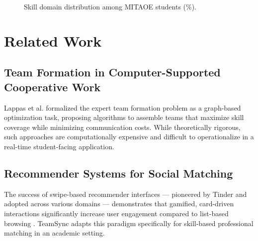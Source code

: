 \documentclass[conference]{IEEEtran}
\begin{document}
\begin{figure}[htbp]
\centering
{}
\caption{Skill domain distribution among MITAOE students (\%).}
\label{fig:domains}
\end{figure}

\section{Related Work}

\subsection{Team Formation in Computer-Supported Cooperative Work}
Lappas et al. \cite{lappas2009finding} formalized the expert team formation problem as a graph-based optimization task, proposing algorithms to assemble teams that maximize skill coverage while minimizing communication costs. While theoretically rigorous, such approaches are computationally expensive and difficult to operationalize in a real-time student-facing application.

\subsection{Recommender Systems for Social Matching}
The success of swipe-based recommender interfaces --- pioneered by Tinder and adopted across various domains --- demonstrates that gamified, card-driven interactions significantly increase user engagement compared to list-based browsing \cite{tyson2016wanted}. TeamSync adapts this paradigm specifically for skill-based professional matching in an academic setting.
\end{document}
